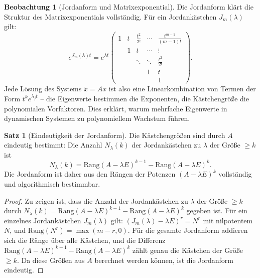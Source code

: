 ﻿\documentclass[a4paper,12pt]{report}
\theoremstyle{definition}
\newtheorem{satz}{Satz}
\newtheorem{beobachtung}{Beobachtung}
\begin{document}
\begin{beobachtung}[Jordanform und Matrixexponential]
    Die Jordanform klärt die Struktur des Matrixexponentials vollständig.
    Für ein Jordankästchen $J_m(\lambda)$ gilt:
    \[
        e^{J_m(\lambda)t} = e^{\lambda t}
        \begin{pmatrix}
            1 & t & \frac{t^2}{2!} & \cdots & \frac{t^{m-1}}{(m-1)!} \\
              & 1 & t & \cdots & \vdots \\
              & & \ddots & \ddots & \frac{t^2}{2!} \\
              & & & 1 & t \\
              & & & & 1
        \end{pmatrix}.
    \]
    Jede Lösung des Systems $\dot{x} = Ax$ ist also eine Linearkombination
    von Termen der Form $t^k e^{\lambda_j t}$ -- die Eigenwerte bestimmen
    die Exponenten, die Kästchengröße die polynomialen Vorfaktoren.
    Dies erklärt, warum mehrfache Eigenwerte in dynamischen Systemen
    zu polynomiellem Wachstum führen.
\end{beobachtung}

\begin{satz}[Eindeutigkeit der Jordanform]
    Die Kästchengrößen sind durch $A$ eindeutig bestimmt: Die Anzahl
    $N_\lambda(k)$ der Jordankästchen zu $\lambda$ der Größe $\geq k$ ist
    \[
        N_\lambda(k) = \mathrm{Rang}(A - \lambda E)^{k-1} -
        \mathrm{Rang}(A - \lambda E)^k.
    \]
    Die Jordanform ist daher aus den Rängen der Potenzen $(A - \lambda E)^k$
    vollständig und algorithmisch bestimmbar.
\end{satz}
\begin{proof}
    Zu zeigen ist, dass die Anzahl der Jordankästchen zu $\lambda$ der Größe $\geq k$
    durch $N_\lambda(k) = \mathrm{Rang}(A - \lambda E)^{k-1} - \mathrm{Rang}(A - \lambda E)^k$
    gegeben ist. Für ein einzelnes Jordankästchen $J_m(\lambda)$ gilt:
    $(J_m(\lambda) - \lambda E)^r = N^r$ mit nilpotentem $N$, und
    $\mathrm{Rang}(N^r) = \max(m - r, 0)$. Für die gesamte Jordanform addieren sich
    die Ränge über alle Kästchen, und die Differenz $\mathrm{Rang}(A-\lambda E)^{k-1}
    - \mathrm{Rang}(A-\lambda E)^k$ zählt genau die Kästchen der Größe $\geq k$.
    Da diese Größen aus $A$ berechnet werden können, ist die Jordanform eindeutig.
\end{proof}


\end{document}

